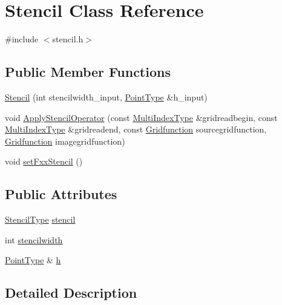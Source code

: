 \hypertarget{class_stencil}{\section{Stencil Class Reference}
\label{dd/d3a/class_stencil}
}


{\ttfamily \#include $<$stencil.\-h$>$}

\subsection*{Public Member Functions}
\begin{DoxyCompactItemize}
\item 
\hyperlink{class_stencil_a418c77f5f4d2ef76c090b16293b64908}{Stencil} (int stencilwidth\-\_\-input, \hyperlink{typedef_8h_af09038ac7e336d283bb9694a57c0572f}{Point\-Type} \&h\-\_\-input)
\item 
void \hyperlink{class_stencil_a34c74428cbe95b447cf43e99a3f66a48}{Apply\-Stencil\-Operator} (const \hyperlink{typedef_8h_a1dd5febfa1b04cfb02de926235bc9e58}{Multi\-Index\-Type} \&gridreadbegin, const \hyperlink{typedef_8h_a1dd5febfa1b04cfb02de926235bc9e58}{Multi\-Index\-Type} \&gridreadend, const \hyperlink{class_gridfunction}{Gridfunction} sourcegridfunction, \hyperlink{class_gridfunction}{Gridfunction} imagegridfunction)
\item 
void \hyperlink{class_stencil_ac91d0e47c76b7424155ac6d010ffbabb}{set\-Fxx\-Stencil} ()
\end{DoxyCompactItemize}
\subsection*{Public Attributes}
\begin{DoxyCompactItemize}
\item 
\hyperlink{typedef_8h_a40ec5f14cb5ce1c0e683a25a38dcc30f}{Stencil\-Type} \hyperlink{class_stencil_a73fd87ad5880d4a3a4cecc63712a0642}{stencil}
\item 
int \hyperlink{class_stencil_a8543574d7ac8d3571ba703aad105c1b8}{stencilwidth}
\item 
\hyperlink{typedef_8h_af09038ac7e336d283bb9694a57c0572f}{Point\-Type} \& \hyperlink{class_stencil_a249ecd9a5cb33e46c115ad132df011c1}{h}
\end{DoxyCompactItemize}


\subsection{Detailed Description}


